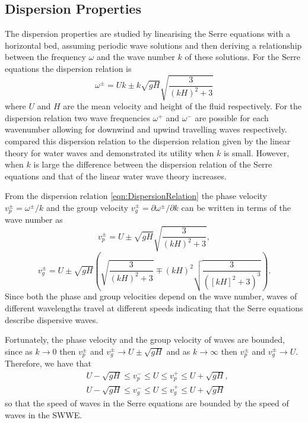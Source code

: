 \subsection{Dispersion Properties}
The dispersion properties are studied by linearising the Serre equations with a horizontal bed, assuming periodic wave solutions and then deriving a relationship between the frequency $\omega$ and the wave number $k$ of these solutions. For the Serre equations the dispersion relation \cite{Li-2014-169} is
\begin{equation}
\label{eqn:DispersionRelation}
\omega^\pm = Uk \pm k \sqrt{gH} \sqrt{\frac{3}{\left(kH\right)^2 + 3}}
\end{equation}
where $U$ and $H$ are the mean velocity and height of the fluid respectively. For the dispersion relation two wave frequencies $\omega^+$ and $\omega^-$ are possible for each wavenumber allowing for downwind and upwind travelling waves respectively. \citet{Barthelemy-2004-315} compared this dispersion relation to the dispersion relation given by the linear theory for water waves and demonstrated its utility when $k$ is small. However, when $k$ is large the difference between the dispersion relation of the Serre equations and that of the linear water wave theory increases. 


From the dispersion relation \eqref{eqn:DispersionRelation} the phase velocity $v_p^\pm = \omega^\pm / k$ and the group velocity $v_g^\pm = \partial \omega^\pm / \partial  k$ can be written in terms of the wave number as
	\begin{equation*}
	\label{eqn:WaveVelocitiesPhase}
	v_p^\pm = U \pm \sqrt{gH}\sqrt{\frac{3}{\left(kH\right)^2 + 3}},
	\end{equation*}
	\begin{equation*}
	\label{eqn:WaveVelocitiesGroup}
	v_g^\pm = U \pm \sqrt{gH} \left(\sqrt{\frac{3}{\left(kH\right)^2 + 3}} \mp \left(kH\right)^2 \sqrt{\frac{3}{\left(\left[kH\right]^2 + 3 \right)^3}}\right).
	\end{equation*}
Since both the phase and group velocities depend on the wave number, waves of different wavelengths travel at different speeds indicating that the Serre equations describe dispersive waves.

Fortunately, the phase velocity and the group velocity of waves are bounded, since as $k \rightarrow 0$ then $v_p^\pm$ and $v_g^\pm \rightarrow U \pm \sqrt{gH}$ and as $k \rightarrow \infty$ then $v_p^\pm$ and $v_g^\pm \rightarrow U$. Therefore, we have that
\begin{subequations}
\begin{align}
&U - \sqrt{gH} \le v_p^- \le U \le v_p^+ \le U + \sqrt{gH}, \\
&U - \sqrt{gH} \le v_g^- \le U \le v_g^+ \le U + \sqrt{gH}
\end{align}
\label{eqn:WaveVelocitiesBound}
\end{subequations}
so that the speed of waves in the Serre equations are bounded by the speed of waves in the SWWE.

